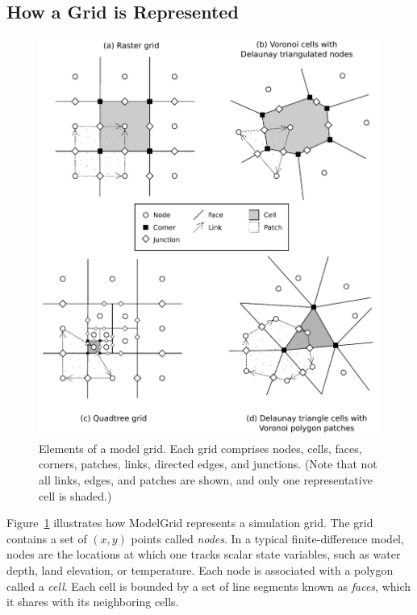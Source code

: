 \documentclass[12pt]{article}
\begin{document}
\subsection{How a Grid is Represented}

 \begin{figure}[h!]
    \centering
    \includegraphics[scale=0.92]{grid_schematic.pdf}
    \caption{Elements of a model grid. Each grid comprises nodes, cells, faces, corners, patches, links, directed edges, and junctions. (Note that not all links, edges, and patches are shown, and only one representative cell is shaded.)}
   \label{grid}
\end{figure}

Figure~\ref{grid} illustrates how ModelGrid represents a simulation grid. The grid contains a set of $(x,y)$ points called {\em nodes}. In a typical finite-difference model, nodes are the locations at which one tracks scalar state variables, such as water depth, land elevation, or temperature. Each node is associated with a polygon called a {\em cell}. Each cell is bounded by a set of line segments known as {\em faces}, which it shares with its neighboring cells.
\end{document}
